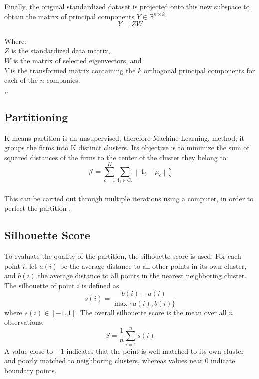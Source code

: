 \documentclass[eng]{ajceam-class}
\begin{document}
Finally, the original standardized dataset is projected onto this new subspace to obtain the matrix of principal components $Y \in \mathbb{R}^{n \times k}$:\\

{\large$$Y = ZW$$}\\

Where:\\
$Z$ is the standardized data matrix,\\
$W$ is the matrix of selected eigenvectors, and\\
$Y$ is the transformed matrix containing the $k$ orthogonal principal components for each of the $n$ companies.\\

\cite{greenacre2022},\cite{caci2023}.

\subsection{Partitioning}

K-means partition is an unsupervised, therefore Machine Learning, method; it groups the firms into K distinct clusters. Its objective is to minimize the sum of squared distances of the firms to the center of the cluster they belong to:\\

{\large$$\mathcal{J} = \sum_{c=1}^{K} \sum_{\mathbf{t}_i \in C_c} \left\| \mathbf{t}_i - \mu_c \right\|_2^2$$}\\

This can be carried out through multiple iterations using a computer, in order to perfect the partition \cite{almansoor2023}.

\subsection{Silhouette Score}

To evaluate the quality of the partition, the silhouette score is used. For each point $i$, let $a(i)$ be the average distance to all other points in its own cluster, and $b(i)$ the average distance to all points in the nearest neighboring cluster. The silhouette of point $i$ is defined as
\begin{equation}
s(i) = \frac{b(i) - a(i)}{\max\{a(i), b(i)\}}
\label{eq:silhouette_point}
\end{equation}
where $s(i) \in [-1, 1]$. The overall silhouette score is the mean over all $n$ observations:
\begin{equation}
S = \frac{1}{n} \sum_{i=1}^{n} s(i)
\label{eq:silhouette_mean}
\end{equation}
A value close to $+1$ indicates that the point is well matched to its own cluster and poorly matched to neighboring clusters, whereas values near $0$ indicate boundary points.
\end{document}
